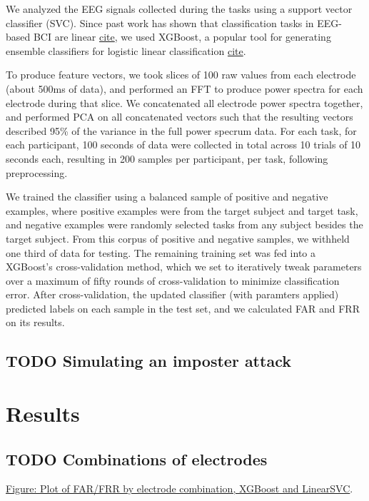 \documentclass[letterpaper,twocolumn,10pt]{article}
\begin{document}
We analyzed the EEG signals collected during the tasks using a support vector classifier (SVC). Since past work has shown that classification tasks in EEG-based BCI are linear \underline{cite}, we used XGBoost, a popular tool for generating ensemble classifiers for logistic linear classification \underline{cite}.

To produce feature vectors, we took slices of 100 raw values from each electrode (about 500ms of data), and performed an FFT to produce power spectra for each electrode during that slice. We concatenated all electrode power spectra together, and performed PCA on all concatenated vectors such that the resulting vectors described 95\% of the variance in the full power specrum data. For each task, for each participant, 100 seconds of data were collected in total across 10 trials of 10 seconds each, resulting in 200 samples per participant, per task, following preprocessing.

We trained the classifier using a balanced sample of positive and negative examples, where positive examples were from the target subject and target task, and negative examples were randomly selected tasks from any subject besides the target subject.
From this corpus of positive and negative samples, we withheld one third of data for testing. 
The remaining training set was fed into a XGBoost's cross-validation method, which we set to iteratively tweak parameters over a maximum of fifty rounds of cross-validation to minimize classification error.
After cross-validation, the updated classifier (with paramters applied) predicted labels on each sample in the test set, and we calculated FAR and FRR on its results.

\subsection{{\bfseries\sffamily TODO} Simulating an imposter attack}
\label{sec:orgdd6e8bd}
\section{Results}
\label{sec:org6705b1d}
\subsection{{\bfseries\sffamily TODO} Combinations of electrodes}
\label{sec:org21b14ae}

\underline{Figure: Plot of FAR/FRR by electrode combination, XGBoost and LinearSVC}.
\end{document}
